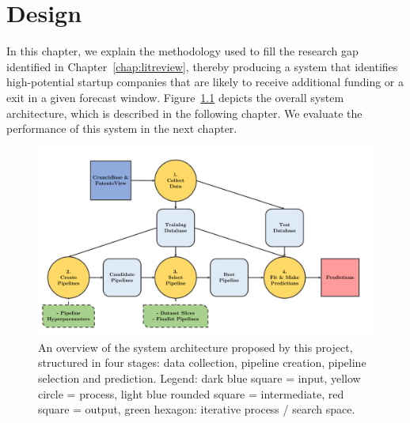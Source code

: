 \documentclass[../thesis/thesis.tex]{subfiles}
\begin{document}
\chapter{Design}
\label{chap:design}

In this chapter, we explain the methodology used to fill the research gap identified in Chapter~\ref{chap:litreview}, thereby producing a system that identifies high-potential startup companies that are likely to receive additional funding or a exit in a given forecast window. Figure~\ref{fig:design:system_architecture} depicts the overall system architecture, which is described in the following chapter. We evaluate the performance of this system in the next chapter.

\begin{figure}[!htb]
    \centering
    \includegraphics[width=\textwidth]{../figures/design/flowchart_overview}
    \caption[System architecture flowchart]{An overview of the system architecture proposed by this project, structured in four stages: data collection, pipeline creation, pipeline selection and prediction. Legend: dark blue square = input, yellow circle = process, light blue rounded square = intermediate, red square = output, green hexagon: iterative process / search space.}
    \label{fig:design:system_architecture}
\end{figure}
\end{document}
